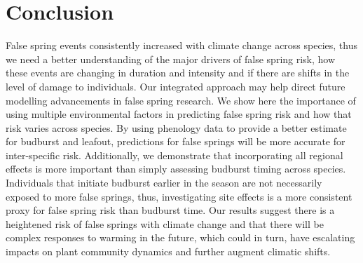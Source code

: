 \documentclass{article}\usepackage[]{graphicx}\usepackage[]{color}
\begin{document}
\section*{Conclusion}
False spring events consistently increased with climate change across species, thus we need a better understanding of the major drivers of false spring risk, how these events are changing in duration and intensity and if there are shifts in the level of damage to individuals. Our integrated approach may help direct future modelling advancements in false spring research. We show here the importance of using multiple environmental factors in predicting false spring risk and how that risk varies across species. By using phenology data to provide a better estimate for budburst and leafout, predictions for false springs will be more accurate for inter-specific risk. Additionally, we demonstrate that incorporating all regional effects is more important than simply assessing budburst timing across species. Individuals that initiate budburst earlier in the season are not necessarily exposed to more false springs, thus, investigating site effects is a more consistent proxy for false spring risk than budburst time. Our results suggest there is a heightened risk of false springs with climate change and that there will be complex responses to warming in the future, which could in turn, have escalating impacts on plant community dynamics and further augment climatic shifts.  

\iffalse 
\end{document}
